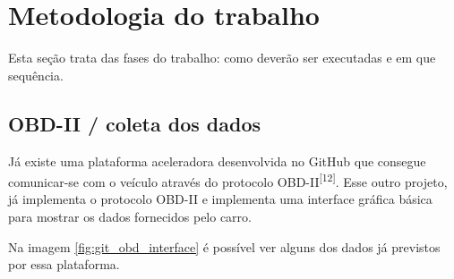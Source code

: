 \chapter{Metodologia do trabalho}
\label{CAP3}

Esta seção trata das fases do trabalho: como deverão ser executadas e em que sequência.



\section{OBD-II / coleta dos dados}
Já existe uma plataforma aceleradora desenvolvida no GitHub que consegue comunicar-se com o veículo através do protocolo OBD-II\textsuperscript{[12]}. Esse outro projeto, já implementa o protocolo OBD-II e implementa uma interface gráfica básica para mostrar os dados fornecidos pelo carro.

Na imagem \ref{fig:git_obd_interface} é possível ver alguns dos dados já previstos por essa plataforma.

